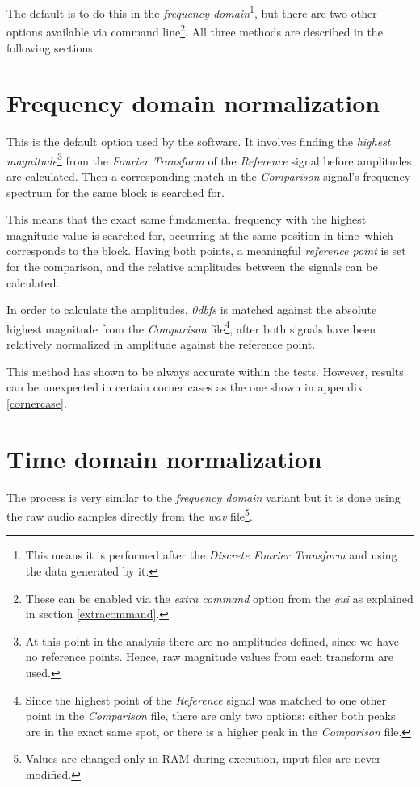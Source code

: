 \documentclass[10pt,a4paper]{report}
\newcommand{\ac}[1]{\textit{\acrshort{#1}}}
\newcommand{\db}[1]{\textit{#1\acrshort{dbfs}}}
\begin{document}
\begin{appendices}
The default is to do this in the \textit{frequency domain}\footnote{This means it is performed after the \textit{Discrete Fourier Transform} and using the data generated by it.}, but there are two other options available via command line\footnote{These can be enabled via the \textit{extra command} option from the \ac{gui} as explained in section \ref{extracommand}.}. All three methods are described in the following sections.

\section{Frequency domain normalization}

This is the default option used by the software. It involves finding the \textit{highest magnitude}\footnote{At this point in the analysis there are no amplitudes defined, since we have no reference points. Hence, raw magnitude values from each transform are used.} from the \textit{Fourier Transform} of the \textit{Reference} signal before amplitudes are calculated. Then a corresponding match in the \textit{Comparison} signal's frequency spectrum for the same block is searched for. 

This means that the exact same fundamental frequency with the highest magnitude value is searched for, occurring at the same position in time--which corresponds to the block. Having both points, a meaningful \textit{reference point} is set for the comparison, and the relative amplitudes between the signals can be calculated.

In order to calculate the amplitudes, \db{0} is matched against the absolute highest magnitude from the \textit{Comparison} file\footnote{Since the highest point of the \textit{Reference} signal was matched to one other point in the \textit{Comparison} file, there are only two options: either both peaks are in the exact same spot, or there is a higher peak in the \textit{Comparison} file.}, after both signals have been relatively normalized in amplitude against the reference point.

This method has shown to be always accurate within the tests. However, results can be unexpected in certain corner cases as the one shown in appendix \ref{cornercase}. 

\section{Time domain normalization}

The process is very similar to the \textit{frequency domain} variant but it is done using the raw audio samples directly from the \ac{wav} file\footnote{Values are changed only in RAM during execution, input files are never modified.}.


\end{appendices}
\end{document}
